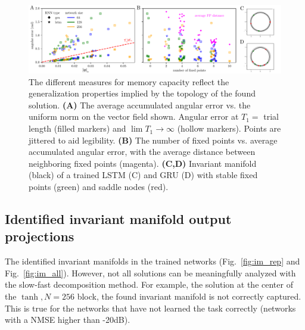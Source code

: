 \documentclass{article} %
\newcounter{ct}
\theoremstyle{definition}
\theoremstyle{remark}
\begin{document}
\begin{figure}[tbhp]
  \centering
  \includegraphics[width=\textwidth]{angular_losses_lstm_gru}
  \caption{%
      The different measures for memory capacity reflect the generalization properties implied by the topology of the found solution.
    \textbf{(A)} The average accumulated angular error vs. the uniform norm on the vector field shown.
     Angular error at \(T_1 =\) trial length (filled markers) and \(\lim T_{1} \to \infty\)  (hollow markers).
      Points are jittered to aid legibility.
    \textbf{(B)} The number of fixed points vs. average accumulated angular error, with the average distance between neighboring fixed points (magenta).
    \textbf{(C,D)} Invariant manifold (black) of a trained LSTM (C) and GRU (D) with stable fixed points (green) and saddle nodes (red).
}\label{fig:angular_losses_lstm_gru}
\end{figure}



\newpage
 \subsection{Identified invariant manifold output projections}\label{sec:inv_man_projections}
 The identified invariant manifolds in the trained networks (Fig.~\ref{fig:im_rep} and Fig.~\ref{fig:im_all}).
 However, not all solutions can be meaningfully analyzed with the slow-fast decomposition method.
 For example, the solution at the center of the \(\tanh, N=256\) block, the found invariant manifold is not correctly captured.
 This is true for the networks that have not learned the task correctly (networks with a NMSE higher than -20dB).
\end{document}

